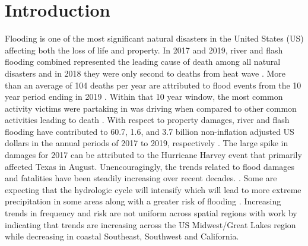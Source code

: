 \section{Introduction}

Flooding is one of the most significant natural disasters in the United States (US) affecting both the loss of life and property. 
In 2017 and 2019, river and flash flooding combined represented the leading cause of death among all natural disasters and in 2018 they were only second to deaths from heat wave \cite{national_weather_service_2020,national_weather_service_2019,national_weather_service_2018}. 
More than an average of 104 deaths per year are attributed to flood events from the 10 year period ending in 2019 \cite{us_department_of_commerce_2020}. 
Within that 10 year window, the most common activity victims were partaking in was driving when compared to other common activities leading to death \cite{us_department_of_commerce_2020}.
With respect to property damages, river and flash flooding have contributed to 60.7, 1.6, and 3.7 billion non-inflation adjusted US dollars in the annual periods of 2017 to 2019, respectively \cite{national_weather_service_2020,national_weather_service_2019,national_weather_service_2018}. 
The large spike in damages for 2017 can be attributed to the Hurricane Harvey event that primarily affected Texas in August. 
Unencouragingly, the trends related to flood damages and fatalities have been steadily increasing over recent decades. \cite{mallakpour2015changing,downton2005reanalysis,kunkel1999temporal,pielke2000precipitation,corringham2019effect}. 
Some are expecting that the hydrologic cycle will intensify which will lead to more extreme precipitation in some areas along with a greater risk of flooding \cite{tabari2020climate,milly2002increasing,wing2018estimates}. 
Increasing trends in frequency and risk are not uniform across spatial regions with work by  indicating that trends are increasing across the US Midwest/Great Lakes region while decreasing in coastal Southeast, Southwest and California.


